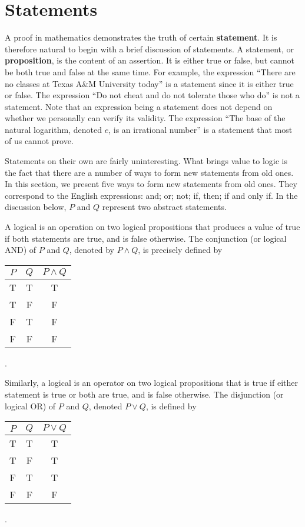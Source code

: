 \section{Statements}

A proof in mathematics demonstrates the truth of certain \textbf{statement}.
It is therefore natural to begin with a brief discussion of statements.
A statement, or \textbf{proposition}, is the content of an assertion.
It is either true or false, but cannot be both true and false at the same time.
For example, the expression ``There are no classes at Texas A\&M University today'' is a statement since it is either true or false.
The expression ``Do not cheat and do not tolerate those who do'' is not a statement.
Note that an expression being a statement does not depend on whether we personally can verify its validity.
The expression ``The base of the natural logarithm, denoted $e$, is an irrational number'' is a statement that most of us cannot prove.

Statements on their own are fairly uninteresting.
What brings value to logic is the fact that there are a number of ways to form new statements from old ones.
In this section, we present five ways to form new statements from old ones.
They correspond to the English expressions: and; or; not; if, then; if and only if.
In the discussion below, $P$ and $Q$ represent two abstract statements.

A logical  is an operation on two logical propositions that produces a value of true if both statements are true, and is false otherwise.
The conjunction (or logical AND) of $P$ and $Q$, denoted by $P \wedge Q$, is precisely defined by
\begin{center}
\begin{tabular}{|c|c|c|}
\hline
$P$ & $Q$ & $P \wedge Q$ \tabularnewline
\hline
T & T & T \tabularnewline
T & F & F \tabularnewline
F & T & F \tabularnewline
F & F & F \tabularnewline
\hline
\end{tabular} .
\end{center}

Similarly, a logical  is an operator on two logical propositions that is true if either statement is true or both are true, and is false otherwise.
The disjunction (or logical OR) of $P$ and $Q$, denoted $P \vee Q$, is defined by
\begin{center}
\begin{tabular}{|c|c|c|}
\hline
$P$ & $Q$ & $P \vee Q$ \tabularnewline
\hline
T & T & T \tabularnewline
T & F & T \tabularnewline
F & T & T \tabularnewline
F & F & F \tabularnewline
\hline
\end{tabular} .
\end{center}

